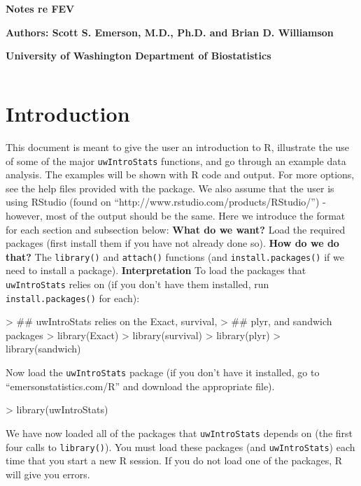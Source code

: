 \documentclass[landscape]{article}
\renewenvironment{Schunk}{\vspace{\topsep}}{\vspace{\topsep}}
\begin{document}

\centerline{\large{\textbf{Notes re FEV}}}
\centerline{\textbf{Authors: Scott S. Emerson, M.D., Ph.D. and Brian D. Williamson}}
\centerline{\textbf{University of Washington Department of Biostatistics}}
\tableofcontents
$$$$
\section{Introduction}
This document is meant to give the user an introduction to R, illustrate the use of some of the major \texttt{uwIntroStats} functions, and go through an example data analysis. The examples will be shown with R code and output. For more options, see the help files provided with the package. We also assume that the user is using RStudio (found on ``http://www.rstudio.com/products/RStudio/'') - however, most of the output should be the same. Here we introduce the format for each section and subsection below: \newline
{\large \textbf{What do we want?}}
\newline \indent Load the required packages (first install them if you have not already done so). \newline
{\large \textbf{How do we do that?}} \newline
The \texttt{library()} and \texttt{attach()} functions (and \texttt{install.packages()} if we need to install a package). \newline
{\large \textbf{Interpretation}}
\newline \indent To load the packages that \texttt{uwIntroStats} relies on (if you don't have them installed, run \texttt{install.packages()} for each):
\begin{Schunk}
\begin{Sinput}
> ## uwIntroStats relies on the Exact, survival, 
> ## plyr, and sandwich packages
> library(Exact)
> library(survival)
> library(plyr)
> library(sandwich)
\end{Sinput}
\end{Schunk}
Now load the \texttt{uwIntroStats} package (if you don't have it installed, go to ``emersonstatistics.com/R'' and download the appropriate file).
\begin{Schunk}
\begin{Sinput}
> library(uwIntroStats)
\end{Sinput}
\end{Schunk}
We have now loaded all of the packages that \texttt{uwIntroStats} depends on (the first four calls to \texttt{library()}). You must load these packages (and \texttt{uwIntroStats}) each time that you start a new R session. If you do not load one of the packages, R will give you errors.
\end{document}
